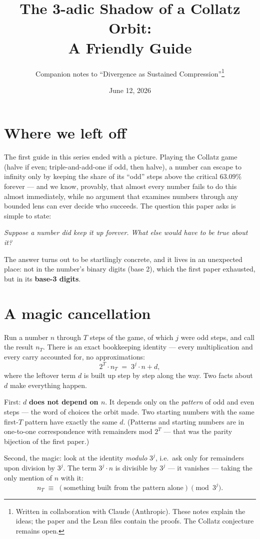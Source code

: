 \documentclass[11pt]{article}
\title{The 3-adic Shadow of a Collatz Orbit:\\
       \Large A Friendly Guide}
\author{Companion notes to ``Divergence as Sustained
Compression''\thanks{Written in collaboration with Claude (Anthropic).
These notes explain the ideas; the paper and the Lean files contain the
proofs. The Collatz conjecture remains open.}}
\date{June 12, 2026}
\begin{document}
\maketitle

\section{Where we left off}

The first guide in this series ended with a picture. Playing the
Collatz game (halve if even; triple-and-add-one if odd, then halve),
a number can escape to infinity only by keeping the share of its
``odd'' steps above the critical $63.09\%$ forever --- and we know,
provably, that almost every number fails to do this almost
immediately, while no argument that examines numbers through any
bounded lens can ever decide who succeeds. The question this paper
asks is simple to state:

\begin{center}
\emph{Suppose a number did keep it up forever. What else would have to
be true about it?}
\end{center}

The answer turns out to be startlingly concrete, and it lives in an
unexpected place: not in the number's binary digits (base 2), which
the first paper exhausted, but in its \textbf{base-3 digits}.

\section{A magic cancellation}

Run a number $n$ through $T$ steps of the game, of which $j$ were odd
steps, and call the result $n_T$. There is an exact bookkeeping
identity --- every multiplication and every carry accounted for, no
approximations:
\[
2^T \cdot n_T \;=\; 3^{j} \cdot n + d,
\]
where the leftover term $d$ is built up step by step along the way.
Two facts about $d$ make everything happen.

First: $d$ \textbf{does not depend on $n$}. It depends only on the
\emph{pattern} of odd and even steps --- the word of choices the orbit
made. Two starting numbers with the same first-$T$ pattern have
exactly the same $d$. (Patterns and starting numbers are in
one-to-one correspondence with remainders mod $2^T$ --- that was the
parity bijection of the first paper.)

Second, the magic: look at the identity \emph{modulo} $3^j$, i.e.\
ask only for remainders upon division by $3^j$. The term
$3^j \cdot n$ is divisible by $3^j$ --- it vanishes --- taking the
only mention of $n$ with it:
\[
n_T \;\equiv\; (\text{something built from the pattern alone})
\pmod{3^{j}}.
\]
\end{document}
